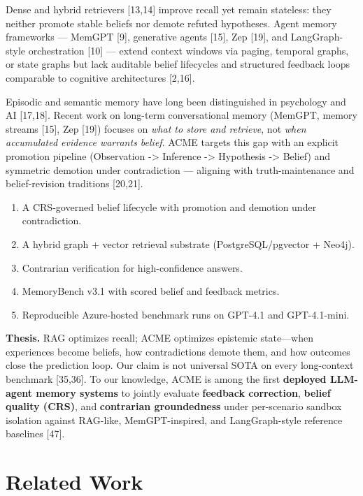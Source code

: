 \documentclass[11pt,a4paper]{article}
\begin{document}
Dense and hybrid retrievers {[}13,14{]} improve recall yet remain
stateless: they neither promote stable beliefs nor demote refuted
hypotheses. Agent memory frameworks --- MemGPT {[}9{]}, generative
agents {[}15{]}, Zep {[}19{]}, and LangGraph-style orchestration
{[}10{]} --- extend context windows via paging, temporal graphs, or
state graphs but lack auditable belief lifecycles and structured
feedback loops comparable to cognitive architectures {[}2,16{]}.

Episodic and semantic memory have long been distinguished in psychology
and AI {[}17,18{]}. Recent work on long-term conversational memory
(MemGPT, memory streams {[}15{]}, Zep {[}19{]}) focuses on \emph{what to
store and retrieve}, not \emph{when accumulated evidence warrants
belief}. ACME targets this gap with an explicit promotion pipeline
(Observation -\textgreater{} Inference -\textgreater{} Hypothesis
-\textgreater{} Belief) and symmetric demotion under contradiction ---
aligning with truth-maintenance and belief-revision traditions
{[}20,21{]}.

\begin{contributions}
\begin{enumerate}
\item A CRS-governed belief lifecycle with promotion and demotion under contradiction.
\item A hybrid graph + vector retrieval substrate (PostgreSQL/pgvector + Neo4j).
\item Contrarian verification for high-confidence answers.
\item MemoryBench v3.1 with scored belief and feedback metrics.
\item Reproducible Azure-hosted benchmark runs on GPT-4.1 and GPT-4.1-mini.
\end{enumerate}
\end{contributions}

\textbf{Thesis.} RAG optimizes recall; ACME optimizes epistemic
state---when experiences become beliefs, how contradictions demote them,
and how outcomes close the prediction loop. Our claim is not universal
SOTA on every long-context benchmark {[}35,36{]}. To our knowledge, ACME
is among the first \textbf{deployed LLM-agent memory systems} to jointly
evaluate \textbf{feedback correction}, \textbf{belief quality (CRS)},
and \textbf{contrarian groundedness} under per-scenario sandbox
isolation against RAG-like, MemGPT-inspired, and LangGraph-style
reference baselines {[}47{]}.

\section{Related Work}\label{related-work}
\end{document}
